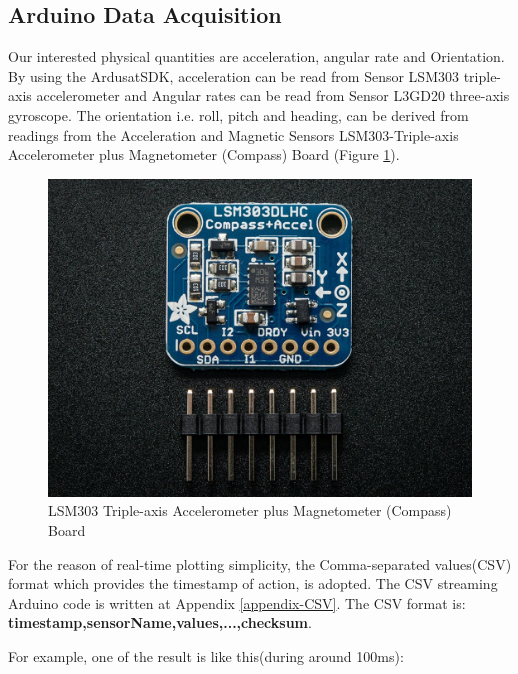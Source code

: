 \subsection{Arduino Data Acquisition}
Our interested physical quantities are acceleration, angular rate and Orientation. By using the ArdusatSDK\cite{ardusatsdk}, acceleration can be read from Sensor LSM303 triple-axis accelerometer and Angular rates can be read from Sensor L3GD20 three-axis gyroscope. The orientation i.e. roll, pitch and heading, can be derived from readings from the Acceleration and Magnetic Sensors LSM303-Triple-axis Accelerometer plus Magnetometer (Compass) Board (Figure \ref{compass board}).

\begin{figure}[!b]
\centering
\includegraphics{fig/DOE/LSM}
\caption{LSM303 Triple-axis Accelerometer plus Magnetometer (Compass) Board}\label{compass board}
\end{figure}

For the reason of real-time plotting simplicity, the Comma-separated values(CSV) format which provides the timestamp of action, is adopted. The CSV streaming Arduino code is written at Appendix \ref{appendix-CSV}. The CSV format is: \textbf{timestamp,sensorName,values,...,checksum}.

For example, one of the result is like this(during around 100ms):

